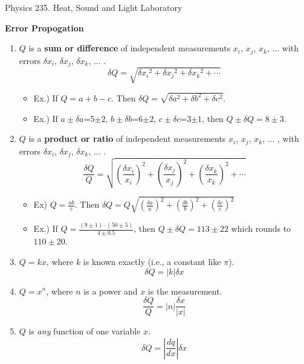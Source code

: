\documentclass[12pt,thmsa]{article}
\begin{document}
%

\begin{centering}
{\Huge  Physics 235.  Heat, Sound and Light Laboratory}
\end{centering}
\bigskip 

\noindent 
{\bf Error Propogation}   

\bigskip 

\begin{enumerate}
\item $Q$ is a {\bf sum or difference} of independent measurements 
$x_i$, $x_j$, $x_k$, ... 
with errors $\delta x_i$, $\delta x_j$, $\delta x_k$, ... .
\[
\delta Q = \sqrt{\delta x{_i}^2 + \delta x{_j}^2 + \delta x{_k}^2 + \cdots }
\]   
 \begin{itemize}
   \item Ex.) If $Q = a + b - c$. Then $\delta Q = \sqrt{\delta a^2 + \delta b^2 + \delta c^2}$.   
   \item Ex.) If $a\pm\delta a$=5$\pm 2$, $b\pm\delta b$=6$\pm 2$, 
    $c\pm\delta c$=3$\pm 1$, then $Q \pm \delta Q = 8\pm 3$.
 \end{itemize}  
\item $Q$ is a {\bf product or ratio} of independent measurements 
$x_i$, $x_j$, $x_k$, ... , 
with errors $\delta x_i$, $\delta x_j$, $\delta x_k$, ... .
\[
\frac{\delta Q}{Q} = \sqrt{(\frac{\delta x{_i}}{{x_i}})^2 + 
(\frac{\delta x{_j}}{{x_j}})^2 + 
(\frac{\delta x{_k}}{{x_k}})^2 + \cdots }
\]
  \begin{itemize}
    \item Ex) $Q = \frac{ab}{c}$.  Then $\delta Q = Q 
\sqrt{ (\frac{\delta a}{a})^2 + (\frac{\delta b}{b})^2 + 
(\frac{\delta c}{c})^2 } $
    \item Ex.) If $Q = \frac{(9\pm1) \cdot (50\pm 5)}{4\pm 0.5}$, then
$Q \pm \delta Q = 113 \pm 22$ which rounds to $110\pm 20$.
  \end{itemize}

\item $Q = kx$, where $k$ is known exactly (i.e., a constant like $\pi$).
\[
 \delta Q = |k| \delta x
\]

\item $Q= x^{n}$, where $n$ is a power and $x$ is the measurement.
\[
 \frac{\delta Q}{Q} = |n| \frac{\delta x}{|x|}
\]
\item $Q$ is {\it any} function of one variable $x$.
\[
 \delta Q = \left|\frac{dq}{dx}\right| \delta x
\]
\end{enumerate}
\end{document}
